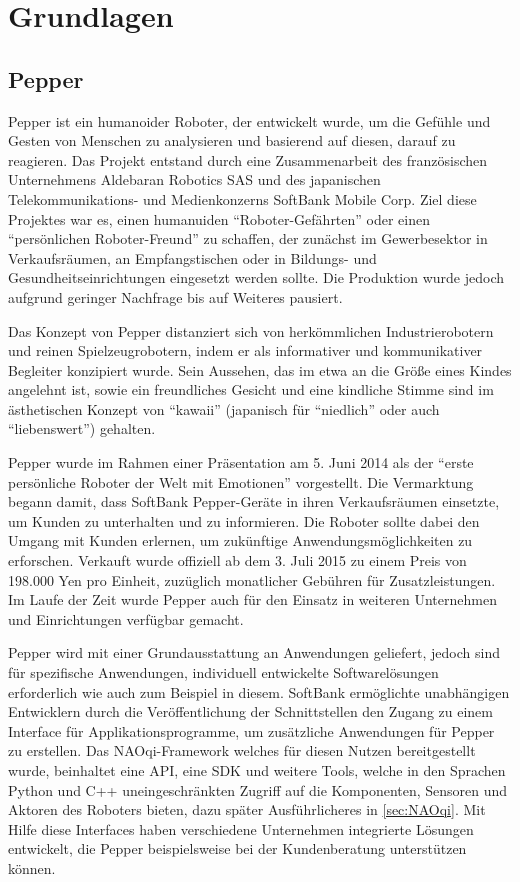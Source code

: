 \chapter{Grundlagen}
\label{chap:Grundlagen}

\section{Pepper}
\label{sec:Pepper}
\par Pepper ist ein humanoider Roboter, der entwickelt wurde, um die Gefühle und Gesten von Menschen zu analysieren und basierend auf diesen, darauf zu reagieren. Das Projekt entstand durch eine Zusammenarbeit des französischen Unternehmens Aldebaran Robotics \ac{SAS} und des japanischen Telekommunikations- und Medienkonzerns SoftBank Mobile Corp. Ziel diese Projektes war es, einen humanuiden ``Roboter-Gefährten'' oder einen ``persönlichen Roboter-Freund'' zu schaffen, der zunächst im Gewerbesektor in Verkaufsräumen, an Empfangstischen oder in Bildungs- und Gesundheitseinrichtungen eingesetzt werden sollte. Die Produktion wurde jedoch aufgrund geringer Nachfrage bis auf Weiteres pausiert.
\par Das Konzept von Pepper distanziert sich von herkömmlichen Industrierobotern und reinen Spielzeugrobotern, indem er als informativer und kommunikativer Begleiter konzipiert wurde. Sein Aussehen, das im etwa an die Größe eines Kindes angelehnt ist, sowie ein freundliches Gesicht und eine kindliche Stimme sind im ästhetischen Konzept von ``kawaii'' (japanisch für ``niedlich'' oder auch ``liebenswert'') gehalten.
\par Pepper wurde im Rahmen einer Präsentation am 5. Juni 2014 als der ``erste persönliche Roboter der Welt mit Emotionen'' vorgestellt. Die Vermarktung begann damit, dass SoftBank Pepper-Geräte in ihren Verkaufsräumen einsetzte, um Kunden zu unterhalten und zu informieren. Die Roboter sollte dabei den Umgang mit Kunden erlernen, um zukünftige Anwendungsmöglichkeiten zu erforschen. Verkauft wurde offiziell ab dem 3. Juli 2015 zu einem Preis von 198.000 Yen pro Einheit, zuzüglich monatlicher Gebühren für Zusatzleistungen. Im Laufe der Zeit wurde Pepper auch für den Einsatz in weiteren Unternehmen und Einrichtungen verfügbar gemacht.
\par Pepper wird mit einer Grundausstattung an Anwendungen geliefert, jedoch sind für spezifische Anwendungen, individuell entwickelte Softwarelösungen erforderlich wie auch zum Beispiel in diesem. SoftBank ermöglichte unabhängigen Entwicklern durch die Veröffentlichung der Schnittstellen den Zugang zu einem Interface für Applikationsprogramme, um zusätzliche Anwendungen für Pepper zu erstellen. Das NAOqi-Framework welches für diesen Nutzen bereitgestellt wurde, beinhaltet eine \ac{API}, eine \ac{SDK} und weitere Tools, welche in den Sprachen Python und C++ uneingeschränkten Zugriff auf die Komponenten, Sensoren und Aktoren des Roboters bieten, dazu später Ausführlicheres in \autoref{sec:NAOqi}. Mit Hilfe diese Interfaces haben verschiedene Unternehmen integrierte Lösungen entwickelt, die Pepper beispielsweise bei der Kundenberatung unterstützen können.

